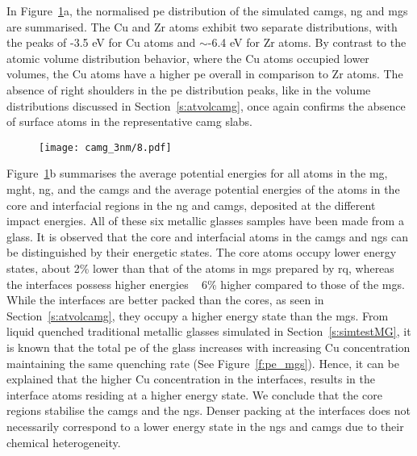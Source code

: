 \begin{changebar}
In Figure~\ref{f:pe_camg}a, the normalised \gls{pe} distribution of the simulated \gls{camg}s, \gls{ng} and \gls{mg}s are summarised. The Cu and Zr atoms exhibit two separate distributions, with the peaks of -3.5 eV for Cu atoms and $\sim$-6.4 eV for Zr atoms. By contrast to the atomic volume distribution behavior, where the Cu atoms occupied lower volumes, the Cu atoms have a higher \gls{pe} overall in comparison to Zr atoms. The absence of right shoulders in the \gls{pe} distribution peaks, like in the volume distributions discussed in Section~\ref{s:atvolcamg}, once again confirms the absence of surface atoms in the representative \gls{camg} slabs. \par

\begin{figure} %
	\centering
	\texttt{[image: camg\_3nm/8.pdf]}
	\label{f:pe_camg}
\end{figure}

Figure~\ref{f:pe_camg}b summarises the average potential energies for all atoms in the \gls{mg}, \gls{mght}, \gls{ng}, and the \gls{camg}s and the average potential energies of the atoms in the core and interfacial regions in the \gls{ng} and \gls{camg}s, deposited at the different impact energies. All of these six metallic glasses samples have been made from a  \cz glass. It is observed that the core and interfacial atoms in the \gls{camg}s and \gls{ng}s can be distinguished by their energetic states. The core atoms occupy lower energy states, about 2\% lower than that of the atoms in \gls{mg}s prepared by \gls{rq}, whereas the interfaces possess higher energies ~ 6\% higher compared to those of the \gls{mg}s. While the interfaces are better packed than the cores, as seen in Section~\ref{s:atvolcamg}, they occupy a higher energy state than the \gls{mg}s. From liquid quenched traditional metallic glasses simulated in Section~\ref{s:simtestMG}, it is known that the total \gls{pe} of the glass increases with increasing Cu concentration maintaining the same quenching rate (See Figure~\ref{f:pe_mgs}). Hence, it can be explained that the higher Cu concentration in the interfaces, results in the interface atoms residing at a higher energy state. We conclude that the core regions stabilise the \gls{camg}s and the \gls{ng}s. Denser packing at the interfaces does not necessarily correspond to a lower energy state in the \gls{ng}s and \gls{camg}s due to their chemical heterogeneity. \par
\end{changebar}
\clearpage

